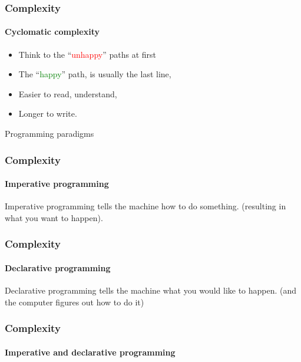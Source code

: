 \begin{frame}
  \frametitle{Complexity}
  \framesubtitle{Cyclomatic complexity}

  \begin{itemize}[<+->]
    \item Think to the ``\textcolor{red}{unhappy}'' paths at first
    \item The ``\textcolor{green}{happy}'' path, is usually the last line,
    \item Easier to read, understand,
    \item Longer to write.
  \end{itemize}
\end{frame}

\begin{frame}[fragile,c]
  \begin{center}
    \Huge
    Programming paradigms
  \end{center}
\end{frame}

\begin{frame}
  \frametitle{Complexity}
  \framesubtitle{Imperative programming}

  Imperative programming tells the machine how to do something.\pause
  (resulting in what you want to happen).

\end{frame}

\begin{frame}
  \frametitle{Complexity}
  \framesubtitle{Declarative programming}

  Declarative programming tells the machine what you would like to happen.\pause
  (and the computer figures out how to do it)

\end{frame}

\begin{frame}
  \frametitle{Complexity}
  \framesubtitle{Imperative and declarative programming}

  
  \pause
  

\end{frame}

